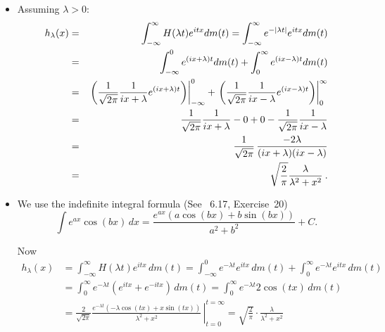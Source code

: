 \begin{itemize}

\item

Assuming \(\lambda>0\):
\begin{eqnarray*}
h_\lambda(x)
  & = & \int_{-\infty}^{\infty} H(\lambda t)e^{itx}dm(t) =
        \int_{-\infty}^{\infty} e^{-|\lambda t|}e^{itx}dm(t) \\
  & = & \int_{-\infty}^0 e^{(ix+\lambda)t}dm(t) +
        \int_0^\infty e^{(ix-\lambda)t}dm(t) \\
  & = & \left.\left(\frac{1}{\sqrt{2\pi}}\frac{1}{ix+\lambda}e^{(ix+\lambda)t}
        \right)\right|_{-\infty}^0 +
        \left.\left(\frac{1}{\sqrt{2\pi}}\frac{1}{ix-\lambda}e^{(ix-\lambda)t}
        \right)\right|_0^\infty \\
  & = & \frac{1}{\sqrt{2\pi}}\frac{1}{ix+\lambda} - 0 +
        0 - \frac{1}{\sqrt{2\pi}}\frac{1}{ix-\lambda} \\
  & = & \frac{1}{\sqrt{2\pi}}\,\frac{-2\lambda}{(ix+\lambda)(ix-\lambda)} \\
  & = & \sqrt{\frac{2}{\pi}}\frac{\lambda}{\lambda^2+x^2}\>.
\end{eqnarray*}

\item
We use the indefinite integral formula 
(See \cite{Apostol1961}~6.17, Exercise~20)
\begin{equation*}
\int e^{ax}\cos(bx)\,dx = \frac{e^{ax}(a\cos(bx) + b\sin(bx))}{a^2+b^2} + C.
\end{equation*}
\iffalse
We use the indefinite integral formula
\begin{equation*}
\int 1/(a+x^2)\,dx = \arctan\left(x/\sqrt{a}\,\right)/\sqrt{a}
\end{equation*}
\fi
\iffalse
which can be verified by
\begin{equation*}
1=\frac{d}{dx}\tan\bigl(\arctan(\x)\bigr)
= \frac{d}{dx}\arctan(x) \frac{d}{dx}\tan\bigl(\arctan(\x)\bigr)
\end{equation*}
\fi

Now
\begin{align*}
h_\lambda(x) 
&= \int_{-\infty}^\infty H(\lambda t)e^{itx}\,dm(t)
  =  \int_{-\infty}^0 e^{-\lambda t} e^{itx}\,dm(t) 
   + \int_0^\infty e^{-\lambda t} e^{itx}\,dm(t)  \\
&= \int_0^\infty e^{-\lambda t} (e^{itx} + e^{-itx})\,dm(t)
 = \int_0^\infty e^{-\lambda t} 2\cos(tx)\,dm(t)  \\
&= \frac{2}{\sqrt{2\pi}}
   \left.\frac{e^{-\lambda t}(-\lambda \cos(tx) + x\sin(tx))}{\lambda^2+x^2} 
   \,\right|_{t=0}^{t=\infty} 
 = \sqrt{\frac{2}{\pi}}\cdot\frac{\lambda}{\lambda^2+x^2}
\end{align*}
\end{itemize}

